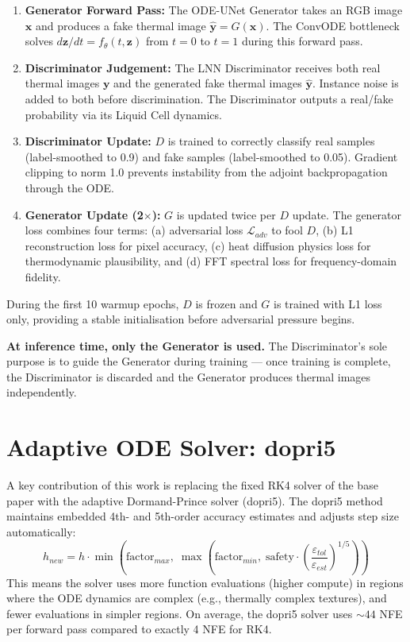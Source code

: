 \begin{enumerate}
    \item \textbf{Generator Forward Pass:} The ODE-UNet Generator takes an RGB image $\mathbf{x}$ and produces a fake thermal image $\hat{\mathbf{y}} = G(\mathbf{x})$. The ConvODE bottleneck solves $d\mathbf{z}/dt = f_\theta(t, \mathbf{z})$ from $t=0$ to $t=1$ during this forward pass.
    \item \textbf{Discriminator Judgement:} The LNN Discriminator receives both real thermal images $\mathbf{y}$ and the generated fake thermal images $\hat{\mathbf{y}}$. Instance noise is added to both before discrimination. The Discriminator outputs a real/fake probability via its Liquid Cell dynamics.
    \item \textbf{Discriminator Update:} $D$ is trained to correctly classify real samples (label-smoothed to 0.9) and fake samples (label-smoothed to 0.05). Gradient clipping to norm 1.0 prevents instability from the adjoint backpropagation through the ODE.
    \item \textbf{Generator Update (2$\times$):} $G$ is updated twice per $D$ update. The generator loss combines four terms: (a) adversarial loss $\mathcal{L}_{adv}$ to fool $D$, (b) L1 reconstruction loss for pixel accuracy, (c) heat diffusion physics loss for thermodynamic plausibility, and (d) FFT spectral loss for frequency-domain fidelity.
\end{enumerate}

During the first 10 warmup epochs, $D$ is frozen and $G$ is trained with L1 loss only, providing a stable initialisation before adversarial pressure begins.

\textbf{At inference time, only the Generator is used.} The Discriminator's sole purpose is to guide the Generator during training --- once training is complete, the Discriminator is discarded and the Generator produces thermal images independently.

\section{Adaptive ODE Solver: dopri5}

A key contribution of this work is replacing the fixed RK4 solver of the base paper with the adaptive Dormand-Prince solver (dopri5). The dopri5 method maintains embedded 4th- and 5th-order accuracy estimates and adjusts step size automatically:
\begin{equation}
    h_{new} = h \cdot \min\!\left(\text{factor}_{max},\; \max\!\left(\text{factor}_{min},\; \text{safety} \cdot \left(\frac{\varepsilon_{tol}}{\varepsilon_{est}}\right)^{1/5}\right)\right)
\end{equation}
This means the solver uses more function evaluations (higher compute) in regions where the ODE dynamics are complex (e.g., thermally complex textures), and fewer evaluations in simpler regions. On average, the dopri5 solver uses $\sim44$ NFE per forward pass compared to exactly 4 NFE for RK4.


